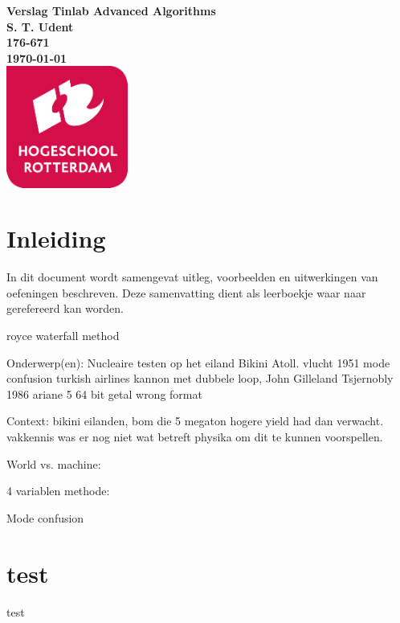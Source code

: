 \documentclass{article}
\begin{document}
\sffamily



\begin{titlepage}
  \centering
    \vfill
    {\bfseries\Huge
      Verslag Tinlab Advanced Algorithms \\
        \vskip2cm
      }
      {\bfseries\Large
        S. T. Udent\\
      }
      {
        \bfseries\normalsize
        176-671\\
        \vskip1cm
        \today\\
    }    
    \vfill
    \includegraphics[width=4cm]{logohr.png} %
    \vfill
    \vfill
\end{titlepage}
\newpage
\tableofcontents

\newpage
\section{Inleiding}
In dit document wordt samengevat uitleg, voorbeelden en uitwerkingen van oefeningen beschreven. Deze samenvatting dient als leerboekje waar naar gerefereerd kan worden. 


royce waterfall method



Onderwerp(en): 
Nucleaire testen op het eiland Bikini Atoll.
vlucht 1951 mode confusion turkish airlines
kannon met dubbele loop, John Gilleland
Tsjernobly 1986
ariane 5 64 bit getal wrong format

Context:
bikini eilanden, bom die 5 megaton hogere yield had dan verwacht. vakkennis was er nog niet wat betreft physika om dit te kunnen voorspellen.


World vs. machine:



4 variablen methode:


Mode confusion 




\section{test}
test
\end{document}
